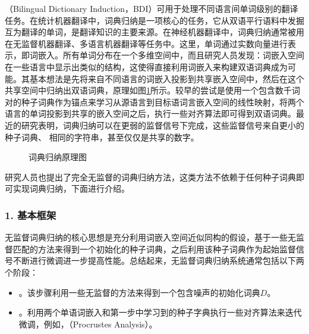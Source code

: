 （Bilingual Dictionary Induction，BDI）可用于处理不同语言间单词级别的翻译任务。在统计机器翻译中，词典归纳是一项核心的任务，它从双语平行语料中发掘互为翻译的单词，是翻译知识的主要来源。在神经机器翻译中，词典归纳通常被用在无监督机器翻译、多语言机器翻译等任务中。这里，单词通过实数向量进行表示，即词嵌入。所有单词分布在一个多维空间中，而且研究人员发现：词嵌入空间在一些语言中显示出类似的结构，这使得直接利用词嵌入来构建双语词典成为可能。其基本想法是先将来自不同语言的词嵌入投影到共享嵌入空间中，然后在这个共享空间中归纳出双语词典，原理如图\ref{fig:16-16}所示。较早的尝试是使用一个包含数千词对的种子词典作为锚点来学习从源语言到目标语词言嵌入空间的线性映射，将两个语言的单词投影到共享的嵌入空间之后，执行一些对齐算法即可得到双语词典。最近的研究表明，词典归纳可以在更弱的监督信号下完成，这些监督信号来自更小的种子词典、 相同的字符串，甚至仅仅是共享的数字。
\begin{figure}[h]
\centering

\caption{词典归纳原理图}
\label{fig:16-16}
\end{figure}

\parinterval 研究人员也提出了完全无监督的词典归纳方法，这类方法不依赖于任何种子词典即可实现词典归纳，下面进行介绍。

\subsubsection{1. 基本框架}

\parinterval 无监督词典归纳的核心思想是充分利用词嵌入空间近似同构的假设，基于一些无监督匹配的方法来得到一个初始化的种子词典，之后利用该种子词典作为起始监督信号不断进行微调进一步提高性能。总结起来，无监督词典归纳系统通常包括以下两个阶段：

\begin{itemize}
\vspace{0.5em}
\item {\small{}}。该步骤利用一些无监督的方法来得到一个包含噪声的初始化词典$D$。
\vspace{0.5em}
\item {\small{}}。利用两个单语词嵌入和第一步中学习到的种子字典执行一些对齐算法来迭代微调，例如，{\small{}}（Procrustes Analysis）。
\vspace{0.5em}
\end{itemize}

